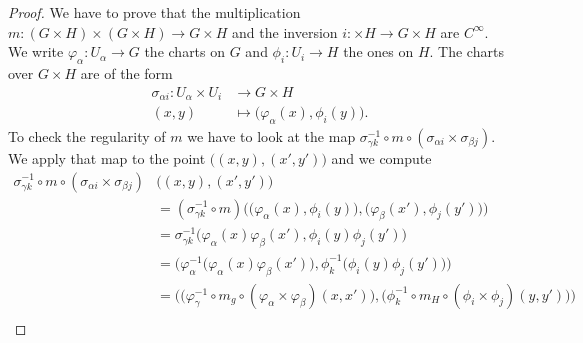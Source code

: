 \begin{proof}
	We have to prove that the multiplication \(m \colon (G\times H)\times (G\times H)\to G\times H  \) and the inversion \(i \colon \times H\to G\times H  \) are \( C^{\infty}\). We write \(\varphi_{\alpha} \colon U_{\alpha}\to G  \) the charts on \( G\) and \(\phi_i \colon U_i\to H  \) the ones on \( H\). The charts over \( G\times H\) are of the form
	\begin{equation}
		\begin{aligned}
			\sigma_{\alpha i}\colon U_{\alpha}\times U_i & \to G\times H                                      \\
			(x,y)                                        & \mapsto \big( \varphi_{\alpha}(x),\phi_i(y) \big).
		\end{aligned}
	\end{equation}
	To check the regularity of \( m\) we have to look at the map \( \sigma^{-1}_{\gamma k}\circ m\circ(\sigma_{\alpha i}\times \sigma_{\beta j})\). We apply that map to the point \(   \big( (x,y),(x',y') \big)  \) and we compute
	\begin{subequations}
		\begin{align}
			\sigma^{-1}_{\gamma k}\circ m\circ (\sigma_{\alpha i}\times \sigma_{\beta j}) & \big( (x,y),(x',y') \big)                                                                                                                                                                   \\
			                                                                              & =(\sigma^{-1}_{\gamma k}\circ m)\Big( \big( \varphi_{\alpha}(x),\phi_i(y) \big),\big( \varphi_{\beta}(x'),\phi_j(y') \big) \Big)                                                            \\
			                                                                              & =\sigma_{\gamma k}^{-1}\Big( \varphi_{\alpha}(x)\varphi_{\beta}(x'),\phi_i(y)\phi_j(y') \Big)                                                                                               \\
			                                                                              & = \Big( \varphi_{\alpha}^{-1}\big( \varphi_{\alpha}(x)\varphi_{\beta}(x') \big),   \phi_k^{-1}\big( \phi_i(y)\phi_j(y') \big) \Big)                                                         \\
			                                                                              & = \Big( \big( \varphi_{\gamma}^{-1}\circ m_g\circ (\varphi_{\alpha}\times \varphi_{\beta})(x,x') \big),\big( \phi_k^{-1}\circ m_H\circ(\phi_i\times \phi_j)(y,y') \big) \Big)               \\

\end{align}
\end{subequations}
\end{proof}
